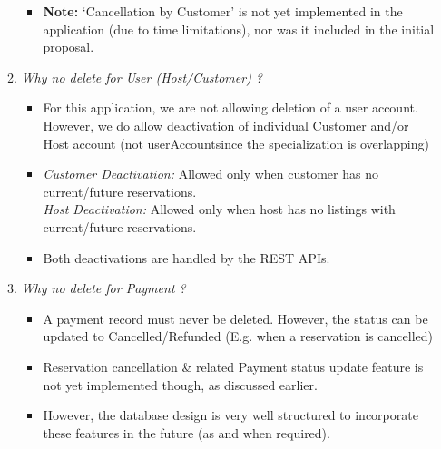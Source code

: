 \documentclass[conference]{IEEEtran}
\begin{document}
\begin{enumerate}
\begin{enumerate}
\begin{itemize}
    	                    \vspace{1mm}

    	                    \item \textbf{Note: } ‘Cancellation by Customer’ is not yet implemented in the application (due to time limitations), nor was it included in the initial proposal.
	                \end{itemize}

                \vspace{1mm}
	            
	            \item \textit{Why no delete for User (Host/Customer) ?}
	                \begin{itemize}
    	                    \item For this application, we are not allowing deletion of a user account. However, we do allow deactivation of individual Customer and/or Host account (not userAccount\textrightarrow since the specialization is overlapping)
    	                    \vspace{1mm}
    	                    \item \textit{Customer Deactivation: }  Allowed only when customer has no current/future reservations.\\
    	                        \textit{Host Deactivation: }  Allowed only when host has no listings with current/future reservations.
    	                    \vspace{1mm}
    	                    \item Both deactivations are handled by the REST APIs.
	                \end{itemize}
                 
	            \vspace{1mm}
             
	            \item \textit{Why no delete for Payment ?}
	                \begin{itemize}
    	                    \item A payment record must never be deleted. However, the status can be updated to Cancelled/Refunded (E.g. when a reservation is cancelled)
    	                    \vspace{1mm}
    	                    \item Reservation cancellation \& related Payment status update feature is not yet implemented though, as discussed earlier.
    	                    \vspace{1mm}
    	                    \item However, the database design is very well structured to incorporate these features in the future (as and when required).
	                \end{itemize}
                 

\end{enumerate}
\end{enumerate}
\end{document}
